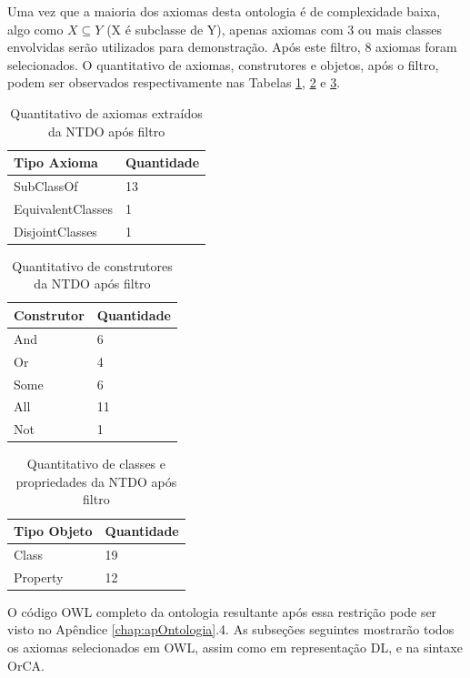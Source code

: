 \documentclass{bcc}
\begin{document}
Uma vez que a maioria dos axiomas desta ontologia é de complexidade baixa, algo como  $X \subseteq Y$ (X é subclasse de Y), apenas axiomas com 3 ou mais classes envolvidas serão utilizados para demonstração. Após este filtro, 8 axiomas foram selecionados. O quantitativo de axiomas, construtores e objetos, após o filtro, podem ser observados respectivamente nas Tabelas \ref{tab:QtdALSNTDO_filtro}, \ref{tab:QtdConstNTDO_filtro} e \ref{tab:QtdObjsNTDO_filtro}. 
\begin{table}[H]
\centering
\begin{tabular}{l|l}
Tipo Axioma       & Quantidade \\ \hline
SubClassOf        & 13         \\ \hline
EquivalentClasses & 1          \\ \hline
DisjointClasses   & 1          \\ 
\end{tabular}
\caption{Quantitativo de axiomas extraídos da NTDO após filtro}
\label{tab:QtdALSNTDO_filtro}
\end{table}

\begin{table}[H]
\centering
\begin{tabular}{l|l}
Construtor & Quantidade \\ \hline
And        & 6          \\ \hline
Or         & 4          \\ \hline
Some       & 6          \\ \hline
All        & 11         \\ \hline
Not        & 1         \\ 
\end{tabular}
\caption{Quantitativo de construtores da NTDO após filtro}
\label{tab:QtdConstNTDO_filtro}
\end{table}

\begin{table}[H]
\centering
\begin{tabular}{l|l}
Tipo Objeto   & Quantidade \\ \hline
Class         & 19         \\ \hline
Property      & 12         \\ 
\end{tabular}
\caption{Quantitativo de classes e propriedades da NTDO após filtro}
\label{tab:QtdObjsNTDO_filtro}
\end{table}

O código OWL completo da ontologia resultante após essa restrição pode ser visto no Apêndice \ref{chap:apOntologia}.4. As subseções seguintes mostrarão todos os axiomas selecionados em OWL, assim como em representação DL, e na sintaxe OrCA. 
\end{document}

